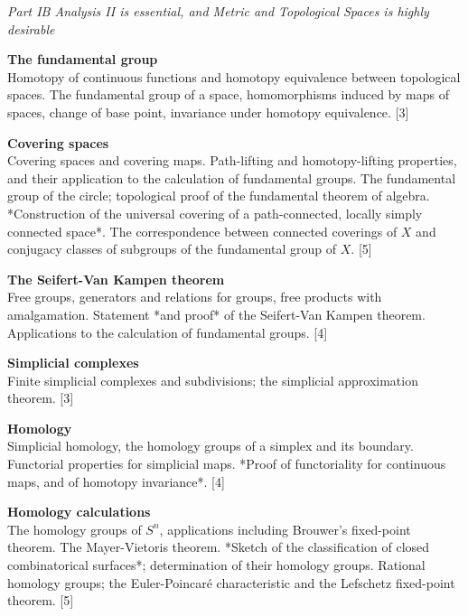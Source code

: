 \documentclass[a4paper]{article}
\begin{document}
\maketitle
{\small
\noindent\emph{Part IB Analysis II is essential, and Metric and Topological Spaces is highly desirable}
\vspace{10pt}

\noindent\textbf{The fundamental group}\\
Homotopy of continuous functions and homotopy equivalence between topological spaces. The fundamental group of a space, homomorphisms induced by maps of spaces, change of base point, invariance under homotopy equivalence.\hspace*{\fill} [3]

\vspace{10pt}
\noindent\textbf{Covering spaces}\\
Covering spaces and covering maps. Path-lifting and homotopy-lifting properties, and their application to the calculation of fundamental groups. The fundamental group of the circle; topological proof of the fundamental theorem of algebra. *Construction of the universal covering of a path-connected, locally simply connected space*. The correspondence between connected coverings of $X$ and conjugacy classes of subgroups of the fundamental group of $X$.\hspace*{\fill} [5]

\vspace{10pt}
\noindent\textbf{The Seifert-Van Kampen theorem}\\
Free groups, generators and relations for groups, free products with amalgamation. Statement *and proof* of the Seifert-Van Kampen theorem. Applications to the calculation of fundamental groups.\hspace*{\fill} [4]

\vspace{10pt}
\noindent\textbf{Simplicial complexes}\\
Finite simplicial complexes and subdivisions; the simplicial approximation theorem.\hspace*{\fill} [3]

\vspace{10pt}
\noindent\textbf{Homology}\\
Simplicial homology, the homology groups of a simplex and its boundary. Functorial properties for simplicial maps. *Proof of functoriality for continuous maps, and of homotopy invariance*.\hspace*{\fill} [4]

\vspace{10pt}
\noindent\textbf{Homology calculations}\\
The homology groups of $S^n$, applications including Brouwer's fixed-point theorem. The Mayer-Vietoris theorem. *Sketch of the classification of closed combinatorical surfaces*; determination of their homology groups. Rational homology groups; the Euler-Poincar\'e characteristic and the Lefschetz fixed-point theorem.\hspace*{\fill} [5]}
\end{document}

